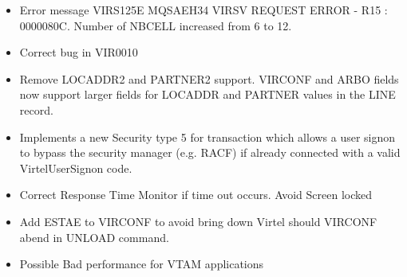 \documentclass[letterpaper,10pt,english]{sphinxmanual}
\begin{document}
\begin{itemize}
\item {} 
Error message VIRS125E MQSAEH34 VIRSV REQUEST ERROR - R15 : 0000080C. Number of NBCELL increased from 6 to 12.

\end{itemize}

\begin{itemize}
\item {} 
Correct bug in VIR0010

\end{itemize}

\begin{itemize}
\item {} 
Remove LOCADDR2 and PARTNER2 support. VIRCONF and ARBO fields now support larger fields for LOCADDR and PARTNER values in the LINE record.

\end{itemize}

\begin{itemize}
\item {} 
Implements a new Security type 5 for transaction which allows a user signon to bypass the security manager (e.g. RACF) if already connected with a valid VirtelUserSignon code.

\end{itemize}

\begin{itemize}
\item {} 
Correct Response Time Monitor if time out occurs. Avoid Screen locked

\end{itemize}

\begin{itemize}
\item {} 
Add ESTAE to VIRCONF to avoid bring down Virtel should VIRCONF abend in UNLOAD command.

\end{itemize}

\begin{itemize}
\item {} 
Possible Bad performance for VTAM applications

\end{itemize}
\end{document}

